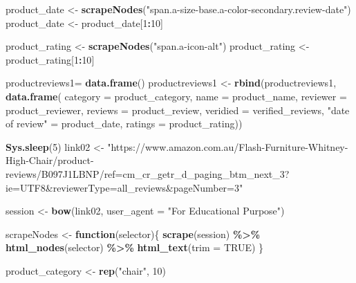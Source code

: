 \documentclass[
]{article}
\newenvironment{Shaded}{\begin{snugshade}}{\end{snugshade}}
\newcommand{\AttributeTok}[1]{\textcolor[rgb]{0.13,0.29,0.53}{#1}}
\newcommand{\ConstantTok}[1]{\textcolor[rgb]{0.56,0.35,0.01}{#1}}
\newcommand{\ControlFlowTok}[1]{\textcolor[rgb]{0.13,0.29,0.53}{\textbf{#1}}}
\newcommand{\DecValTok}[1]{\textcolor[rgb]{0.00,0.00,0.81}{#1}}
\newcommand{\FunctionTok}[1]{\textcolor[rgb]{0.13,0.29,0.53}{\textbf{#1}}}
\newcommand{\NormalTok}[1]{#1}
\newcommand{\OtherTok}[1]{\textcolor[rgb]{0.56,0.35,0.01}{#1}}
\newcommand{\SpecialCharTok}[1]{\textcolor[rgb]{0.81,0.36,0.00}{\textbf{#1}}}
\newcommand{\StringTok}[1]{\textcolor[rgb]{0.31,0.60,0.02}{#1}}
\begin{document}
\begin{Shaded}
\begin{Highlighting}[]
\NormalTok{  product\_date }\OtherTok{\textless{}{-}} \FunctionTok{scrapeNodes}\NormalTok{(}\StringTok{"span.a{-}size{-}base.a{-}color{-}secondary.review{-}date"}\NormalTok{)}
\NormalTok{  product\_date }\OtherTok{\textless{}{-}}\NormalTok{ product\_date[}\DecValTok{1}\SpecialCharTok{:}\DecValTok{10}\NormalTok{]}
  
\NormalTok{  product\_rating }\OtherTok{\textless{}{-}} \FunctionTok{scrapeNodes}\NormalTok{(}\StringTok{"span.a{-}icon{-}alt"}\NormalTok{)}
\NormalTok{  product\_rating }\OtherTok{\textless{}{-}}\NormalTok{ product\_rating[}\DecValTok{1}\SpecialCharTok{:}\DecValTok{10}\NormalTok{]}
  
\NormalTok{  productreviews1}\OtherTok{=} \FunctionTok{data.frame}\NormalTok{()}
\NormalTok{  productreviews1 }\OtherTok{\textless{}{-}} \FunctionTok{rbind}\NormalTok{(productreviews1, }\FunctionTok{data.frame}\NormalTok{(}
                      \AttributeTok{category =}\NormalTok{ product\_category,}
                      \AttributeTok{name =}\NormalTok{ product\_name,}
                      \AttributeTok{reviewer =}\NormalTok{ product\_reviewer,}
                      \AttributeTok{reviews =}\NormalTok{ product\_review,}
                      \AttributeTok{veridied =}\NormalTok{ verified\_reviews,}
                      \StringTok{"date of review"} \OtherTok{=}\NormalTok{ product\_date,}
                      \AttributeTok{ratings =}\NormalTok{ product\_rating))}

  
 \FunctionTok{Sys.sleep}\NormalTok{(}\DecValTok{5}\NormalTok{)}
\NormalTok{link02 }\OtherTok{\textless{}{-}} \StringTok{"https://www.amazon.com.au/Flash{-}Furniture{-}Whitney{-}High{-}Chair/product{-}reviews/B097J1LBNP/ref=cm\_cr\_getr\_d\_paging\_btm\_next\_3?ie=UTF8\&reviewerType=all\_reviews\&pageNumber=3"}


\NormalTok{  session }\OtherTok{\textless{}{-}} \FunctionTok{bow}\NormalTok{(link02,}
               \AttributeTok{user\_agent =} \StringTok{"For Educational Purpose"}\NormalTok{)}

\NormalTok{  scrapeNodes }\OtherTok{\textless{}{-}} \ControlFlowTok{function}\NormalTok{(selector)\{}
    \FunctionTok{scrape}\NormalTok{(session) }\SpecialCharTok{\%\textgreater{}\%}
      \FunctionTok{html\_nodes}\NormalTok{(selector) }\SpecialCharTok{\%\textgreater{}\%}
      \FunctionTok{html\_text}\NormalTok{(}\AttributeTok{trim =} \ConstantTok{TRUE}\NormalTok{)}
\NormalTok{  \}}

\NormalTok{  product\_category }\OtherTok{\textless{}{-}} \FunctionTok{rep}\NormalTok{(}\StringTok{"chair"}\NormalTok{, }\DecValTok{10}\NormalTok{)}


\end{Highlighting}
\end{Shaded}
\end{document}
